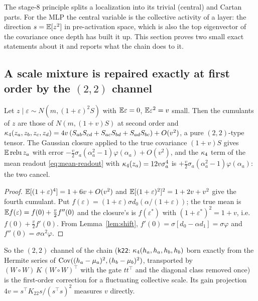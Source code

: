 \label{sec:central}
The stage-8 principle splits a localization into its trivial (central) and Cartan parts. For the \textsc{MLP} the
central variable is the collective activity of a layer: the direction $s=\mathbb E[z^2]$ in pre-activation space, which is
also the top eigenvector of the covariance once depth has built it up. This section proves two small exact
statements about it and reports what the chain does to it.

\subsection{A scale mixture is repaired exactly at first order by the $(2,2)$ channel}
\begin{lemma}\label{lem:scale}
Let $z\mid\varepsilon\sim N(m,(1+\varepsilon)^2S)$ with $\mathbb E\varepsilon=0$, $\mathbb E\varepsilon^2=v$ small. Then the
cumulants of $z$ are those of $N(m,(1+v)S)$ at second order and $\kappa_4(z_a,z_b,z_c,z_d)=4v\,(S_{ab}S_{cd}+
S_{ac}S_{bd}+S_{ad}S_{bc})+O(v^2)$, a pure $(2,2)$-type tensor. The Gaussian closure applied to the true
covariance $(1+v)S$ gives $\mathbb E\operatorname{relu} z_a$ with error $-\tfrac v2\sigma_a(\alpha_a^2-1)\varphi(\alpha_a)+O(v^2)$, and
the $\kappa_4$ term of the mean readout \eqref{eq:mean-readout} with $\kappa_4(z_a)=12v\sigma_a^4$ is
$+\tfrac v2\sigma_a(\alpha_a^2-1)\varphi(\alpha_a)$: the two cancel.
\end{lemma}
\begin{proof}
$\mathbb E[(1+\varepsilon)^4]=1+6v+O(v^2)$ and $\mathbb E[(1+\varepsilon)^2]^2=1+2v+v^2$ give the fourth cumulant. Put
$f(\varepsilon)=(1+\varepsilon)\sigma d_0(\alpha/(1+\varepsilon))$; the true mean is $\mathbb E f(\varepsilon)=f(0)+\tfrac v2f''(0)$
and the closure's is $f(\varepsilon^*)$ with $(1+\varepsilon^*)^2=1+v$, i.e.\ $f(0)+\tfrac v2f'(0)$. From
Lemma~\ref{lem:shift}, $f'(0)=\sigma[d_0-\alpha d_1]=\sigma\varphi$ and $f''(0)=\sigma\alpha^2\varphi$.
\end{proof}
So the $(2,2)$ channel of the chain (\texttt{k22}: $\kappa_4(h_a,h_a,h_b,h_b)$ born exactly from the Hermite series of
$\operatorname{Cov}((h_a-\mu_a)^2,(h_b-\mu_b)^2)$, transported by $(W\!\circ\!W)\,K\,(W\!\circ\!W)^\top$ with the gate $tt^\top$ and
the diagonal class removed once) is the first-order correction for a fluctuating collective scale. Its gain
projection $4v=s^\top K_{22}s/(s^\top s)^2$ measures $v$ directly.

